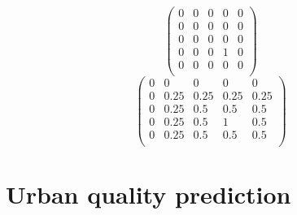 \documentclass[letterpaper]{article}
\begin{document}
\begin{equation}
\begin{pmatrix}
    0 & 0 & 0 & 0 & 0 \\
    0 & 0 & 0 & 0 & 0 \\
    0 & 0 & 0 & 0 & 0 \\
    0 & 0 & 0 & 1 & 0 \\
    0 & 0 & 0 & 0 & 0 \\
\end{pmatrix}
\label{eq:MatA}
\end{equation}
\begin{equation}
\begin{pmatrix}
    0 & 0 & 0 & 0 & 0 \\
    0 & 0.25 & 0.25 & 0.25 & 0.25 \\
    0 & 0.25 & 0.5 & 0.5 & 0.5 \\
    0 & 0.25 & 0.5 & 1 & 0.5 \\
    0 & 0.25 & 0.5 & 0.5 & 0.5 \\
\end{pmatrix}
\label{eq:MatB}
\end{equation}

\section{Urban quality prediction}\label{sec:predictions}
\end{document}
